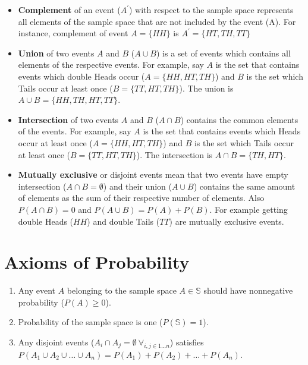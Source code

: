 \documentclass[]{book}
\providecommand{\tightlist}{%
  \setlength{\itemsep}{0pt}\setlength{\parskip}{0pt}}
\theoremstyle{definition}
\theoremstyle{definition}
\theoremstyle{definition}
\theoremstyle{remark}
\begin{document}
\begin{itemize}
\item
  \textbf{Complement} of an event (\(A^\prime\)) with respect to the
  sample space represents all elements of the sample space that are not
  included by the event (A). For instance, complement of event
  \(A=\{HH\}\) is \(A^\prime=\{HT,TH,TT\}\)
\item
  \textbf{Union} of two events \(A\) and \(B\) (\(A \cup B\)) is a set
  of events which contains all elements of the respective events. For
  example, say \(A\) is the set that contains events which double Heads
  occur (\(A = \{HH,HT,TH\}\)) and \(B\) is the set which Tails occur at
  least once (\(B = \{TT,HT,TH\}\)). The union is
  \(A \cup B = \{HH,TH,HT,TT\}\).
\item
  \textbf{Intersection} of two events \(A\) and \(B\) (\(A \cap B\))
  contains the common elements of the events. For example, say \(A\) is
  the set that contains events which Heads occur at least once
  (\(A = \{HH,HT,TH\}\)) and \(B\) is the set which Tails occur at least
  once (\(B = \{TT,HT,TH\}\)). The intersection is
  \(A \cap B = \{TH,HT\}\).
\item
  \textbf{Mutually exclusive} or disjoint events mean that two events
  have empty intersection (\(A \cap B = \emptyset\)) and their union
  (\(A \cup B\)) contains the same amount of elements as the sum of
  their respective number of elements. Also \(P(A \cap B) = 0\) and
  \(P(A \cup B) = P(A) + P(B)\). For example getting double Heads
  (\(HH\)) and double Tails (\(TT\)) are mutually exclusive events.
\end{itemize}

\hypertarget{axioms-of-probability}{%
\section{Axioms of Probability}\label{axioms-of-probability}}

\begin{enumerate}
\def\labelenumi{\arabic{enumi}.}
\tightlist
\item
  Any event \(A\) belonging to the sample space \(A \in \mathbb{S}\)
  should have nonnegative probability (\(P(A) \ge 0\)).
\item
  Probability of the sample space is one (\(P(\mathbb{S}) = 1\)).
\item
  Any disjoint events
  (\(A_i \cap A_j = \emptyset \ \forall_{i,j \in 1 \dots n}\)) satisfies
  \(P(A_1 \cup A_2 \cup \dots \cup A_n) = P(A_1) + P(A_2) + \dots + P(A_n)\).
\end{enumerate}
\end{document}
